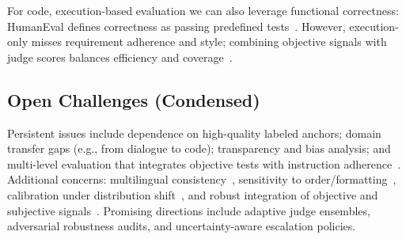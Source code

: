For code, execution-based evaluation we can also leverage functional correctness: HumanEval defines correctness as passing predefined tests~\citep{chen2021evaluating}. However, execution-only misses requirement adherence and style; combining objective signals with judge scores balances efficiency and coverage~\cite{li2024_llmsasjudges}.

\subsection{Open Challenges (Condensed)}
Persistent issues include dependence on high-quality labeled anchors; domain transfer gaps (e.g., from dialogue to code); transparency and bias analysis; and multi-level evaluation that integrates objective tests with instruction adherence~\cite{li2024_llmsasjudges, chen2021evaluating}. Additional concerns: multilingual consistency~\cite{hada2024metal}, sensitivity to order/formatting~\cite{zheng2023judgelm}, calibration under distribution shift~\cite{bavaresco2024judgebench}, and robust integration of objective and subjective signals~\cite{liang2022helm}. Promising directions include adaptive judge ensembles, adversarial robustness audits, and uncertainty-aware escalation policies. %